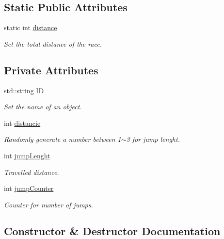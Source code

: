 \subsection*{Static Public Attributes}
\begin{DoxyCompactItemize}
\item 
static int \hyperlink{classFrog_a5846a1d18091a9d5409cd7ab3a93abdf}{distance}
\begin{DoxyCompactList}\small\item\em Set the total distance of the race. \end{DoxyCompactList}\end{DoxyCompactItemize}
\subsection*{Private Attributes}
\begin{DoxyCompactItemize}
\item 
std\+::string \hyperlink{classFrog_ac2fe938591f6471cbea049b87dbc2a2e}{ID}
\begin{DoxyCompactList}\small\item\em Set the name of an object. \end{DoxyCompactList}\item 
int \hyperlink{classFrog_acfa2696ff1e9483acfc3c60941a9a540}{distancie}
\begin{DoxyCompactList}\small\item\em Randomly generate a number between 1$\sim$3 for jump lenght. \end{DoxyCompactList}\item 
int \hyperlink{classFrog_a8ce20ccfa8a10afc1465a2c60e33b53d}{jump\+Lenght}
\begin{DoxyCompactList}\small\item\em Travelled distance. \end{DoxyCompactList}\item 
int \hyperlink{classFrog_a3d38d6ca4384c9d2cb4b770d93cf7dd5}{jump\+Counter}
\begin{DoxyCompactList}\small\item\em Counter for number of jumps. \end{DoxyCompactList}\end{DoxyCompactItemize}


\subsection{Constructor \& Destructor Documentation}
